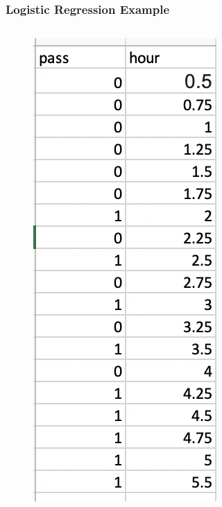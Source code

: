 \documentclass[11pt]{beamer}
\begin{document}
\begin{frame}
\frametitle{Logistic Regression Example}

\begin{columns}
    \begin{column}{0.3\textwidth}
        \begin{figure}
            \centering
            \includegraphics[width=0.7\linewidth]{pic/logistic_data}
            \label{fig:logisticdata}
        \end{figure}

\end{column}
\end{columns}
\end{frame}
\end{document}
